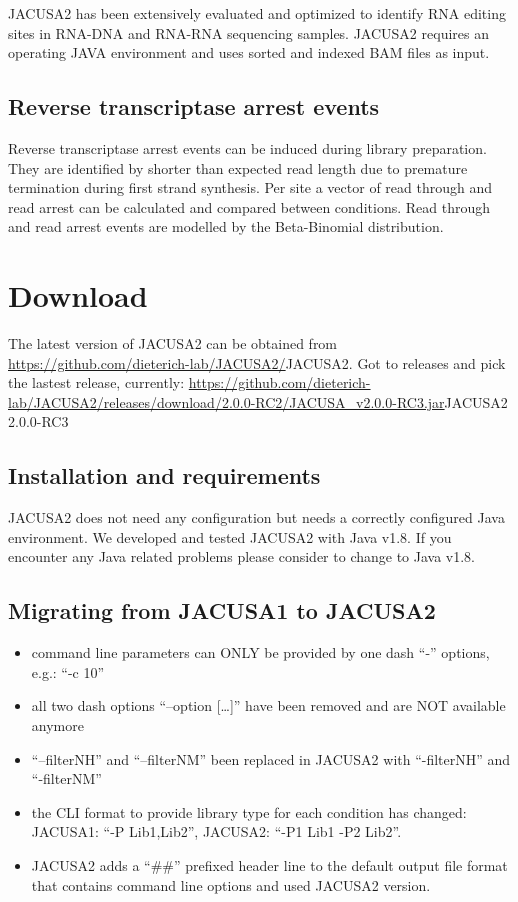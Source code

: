\documentclass[10pt,a4paper,draft]{article}
\begin{document}
JACUSA2 has been extensively evaluated and optimized to identify RNA editing sites in RNA-DNA and
RNA-RNA sequencing samples. JACUSA2 requires an operating JAVA environment and uses sorted and
indexed BAM files as input.
\subsection{Reverse transcriptase arrest events}
Reverse transcriptase arrest events can be induced during library preparation. 
They are identified by shorter than expected read length due to premature termination during first 
strand synthesis. Per site a vector of read through and read arrest can be calculated and compared between conditions.
Read through and read arrest events are modelled by the Beta-Binomial distribution.
\section{Download}
The latest version of JACUSA2 can be obtained from \url{https://github.com/dieterich-lab/JACUSA2/}{JACUSA2}.
Got to releases and pick the lastest release, currently:  
\url{https://github.com/dieterich-lab/JACUSA2/releases/download/2.0.0-RC2/JACUSA_v2.0.0-RC3.jar}{JACUSA2 2.0.0-RC3} 
\subsection{Installation and requirements}
JACUSA2 does not need any configuration but needs a correctly configured Java environment.
We developed and tested JACUSA2 with Java v1.8. If you encounter any Java related problems please
consider to change to Java v1.8.
\subsection{Migrating from JACUSA1 to JACUSA2}
\begin{itemize}
  \item command line parameters can ONLY be provided by one dash ``-'' options, e.g.: ``-c 10''
  \item all two dash options ``--option [\ldots]'' have been removed and are NOT available anymore
  \item ``--filterNH'' and ``--filterNM'' been replaced in JACUSA2 with ``-filterNH'' and ``-filterNM''
  \item {} the CLI format to provide library type for each condition has changed:
  JACUSA1: ``-P Lib1,Lib2'', JACUSA2: ``-P1 Lib1 -P2 Lib2''.
  \item JACUSA2 adds a ``\#\#'' prefixed header line to the default output file format that contains command line options and used JACUSA2 version.
\end{itemize}
\end{document}

